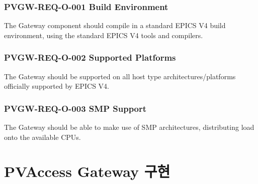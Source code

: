 \documentclass[11pt
  , a4paper
  , article
  , oneside
]{memoir}
\begin{document}
\subsubsection{PVGW-REQ-O-001 Build Environment}
The Gateway component should compile in a standard EPICS V4 build environment, using the standard EPICS V4 tools and compilers.

\subsubsection{PVGW-REQ-O-002 Supported Platforms}
The Gateway should be supported on all host type architectures/platforms officially supported by EPICS V4.

\subsubsection{PVGW-REQ-O-003 SMP Support}
The Gateway should be able to make use of SMP architectures, distributing load onto the available CPUs.





\section{PVAccess Gateway 구현}




























\clearpage


\end{document}
